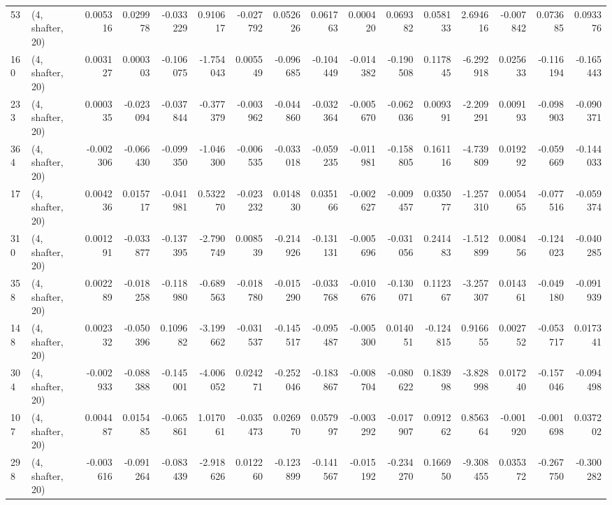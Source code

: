\begin{tabular}{llrrrrrrrrrrrrrr}
53  &  (4, shafter, 20) &   0.005316 &  0.029978 & -0.033229 &    0.910617 & -0.027792 &   0.052626 &  0.061763 &  0.000420 &  0.069382 &  0.058133 &    2.694616 & -0.007842 &  0.073685 &  0.093376 \\
160 &  (4, shafter, 20) &   0.003127 &  0.000303 & -0.106075 &   -1.754043 &  0.005549 &  -0.096685 & -0.104449 & -0.014382 & -0.190508 &  0.117845 &   -6.292918 &  0.025633 & -0.116194 & -0.165443 \\
233 &  (4, shafter, 20) &   0.000335 & -0.023094 & -0.037844 &   -0.377379 & -0.003962 &  -0.044860 & -0.032364 & -0.005670 & -0.062036 &  0.009391 &   -2.209291 &  0.009193 & -0.098903 & -0.090371 \\
364 &  (4, shafter, 20) &  -0.002306 & -0.066430 & -0.099350 &   -1.046300 & -0.006535 &  -0.033018 & -0.059235 & -0.011981 & -0.158805 &  0.161116 &   -4.739809 &  0.019292 & -0.059669 & -0.144033 \\
17  &  (4, shafter, 20) &   0.004236 &  0.015717 & -0.041981 &    0.532270 & -0.023232 &   0.014830 &  0.035166 & -0.002627 & -0.009457 &  0.035077 &   -1.257310 &  0.005465 & -0.077516 & -0.059374 \\
310 &  (4, shafter, 20) &   0.001291 & -0.033877 & -0.137395 &   -2.790749 &  0.008539 &  -0.214926 & -0.131131 & -0.005696 & -0.031056 &  0.241483 &   -1.512899 &  0.008456 & -0.124023 & -0.040285 \\
358 &  (4, shafter, 20) &   0.002289 & -0.018258 & -0.118980 &   -0.689563 & -0.018780 &  -0.015290 & -0.033768 & -0.010676 & -0.130071 &  0.112367 &   -3.257307 &  0.014361 & -0.049180 & -0.091939 \\
148 &  (4, shafter, 20) &   0.002332 & -0.050396 &  0.109682 &   -3.199662 & -0.031537 &  -0.145517 & -0.095487 & -0.005300 &  0.014051 & -0.124815 &    0.916655 &  0.002752 & -0.053717 &  0.017341 \\
304 &  (4, shafter, 20) &  -0.002933 & -0.088388 & -0.145001 &   -4.006052 &  0.024271 &  -0.252046 & -0.183867 & -0.008704 & -0.080622 &  0.183998 &   -3.828998 &  0.017240 & -0.157046 & -0.094498 \\
107 &  (4, shafter, 20) &   0.004487 &  0.015485 & -0.065861 &    1.017061 & -0.035473 &   0.026970 &  0.057997 & -0.003292 & -0.017907 &  0.091262 &    0.856364 & -0.001920 & -0.001698 &  0.037202 \\
298 &  (4, shafter, 20) &  -0.003616 & -0.091264 & -0.083439 &   -2.918626 &  0.012260 &  -0.123899 & -0.141567 & -0.015192 & -0.234270 &  0.166950 &   -9.308455 &  0.035372 & -0.267750 & -0.300282 \\

\end{tabular}
